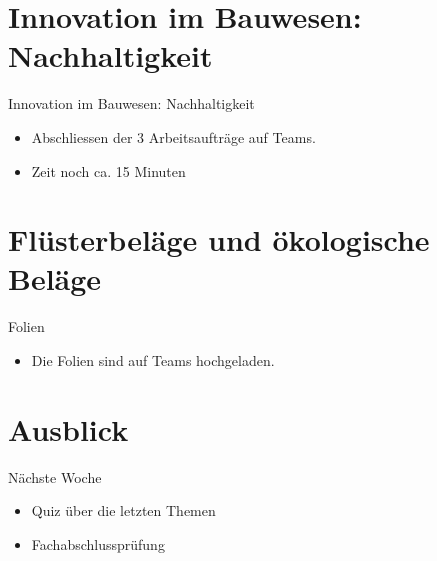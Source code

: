 \section{Innovation im Bauwesen: Nachhaltigkeit}
\BlueSectionSlide
\begin{frame}{Innovation im Bauwesen: Nachhaltigkeit}
    \begin{itemize}
        \item Abschliessen der 3 Arbeitsaufträge auf Teams.
        \item Zeit noch ca. 15 Minuten
    \end{itemize}

\end{frame}

\section{Flüsterbeläge und ökologische Beläge}
\BlueSectionSlide

\begin{frame}{Folien}
    \begin{itemize}
        \item Die Folien sind auf Teams hochgeladen.
    \end{itemize}
\end{frame}


\section{Ausblick}
\BlueSectionSlide
\begin{frame}{Nächste Woche}
    \begin{itemize}
        \item Quiz über die letzten Themen 
        \item Fachabschlussprüfung
    \end{itemize}

\end{frame}










